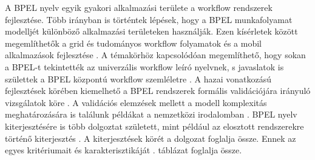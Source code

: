 A BPEL nyelv egyik gyakori alkalmazási területe a workflow rendszerek fejlesztése. Több irányban is történtek lépések, hogy a BPEL munkafolyamat modelljét különböző alkalmazási területeken használják. Ezen kísérletek között megemlíthetők a grid és tudományos  workflow folyamatok \cite{slominski2007adapting} és a mobil alkalmazások fejlesztése \cite{hackmann2006sliver}. A témakörhöz kapcsolódóan megemlíthető, hogy sokan a BPEL-t tekintették az univerzális workflow leíró nyelvnek, s javaslatok is születtek a BPEL központú workflow szemléletre \cite{van2008translating}. A  hazai vonatkozású fejlesztések körében kiemelhető a BPEL rendszerek formális validációjára irányuló vizsgálatok köre \cite{kovacs2008formal}. A validációs elemzések mellett a modell komplexitás meghatározására is találunk példákat a nemzetközi irodalomban  \cite{cardoso2007complexity}. 
\newpage
BPEL nyelv kiterjesztésére is több dolgoztat született, mint például az elosztott rendszerekre történő kiterjesztés \cite{baresi2007towards}. A kiterjesztések körét a \cite{kopp2011classification} dolgozat foglalja össze. Ennek az egyes kritériumait és karakterisztikáját . táblázat foglalja össze.

